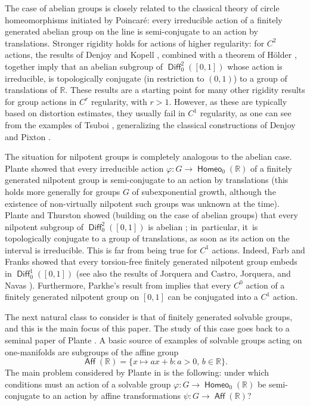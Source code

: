\documentclass[JEP,XML,SOM,Unicode,NoFloatCountersInSection,published]{cedram}
\theoremstyle{definition}
\DeclareMathOperator{\Aff}{\mathsf{Aff}}
\DeclareMathOperator{\Diff}{\mathsf{Diff}}
\DeclareMathOperator{\homeo}{\mathsf{Homeo}}
\newcommand{\R}{\mathbb{R}}
\begin{document}
The case of abelian groups is closely related to the classical theory of circle homeomorphisms initiated by Poincaré: every irreducible action of a finitely generated abelian group on the line is semi-conjugate to an action by translations. Stronger rigidity holds for actions of higher regularity: for $C^2$ actions, the results of Denjoy \cite{Denjoy} and Kopell \cite{Kopell}, combined with a theorem of Hölder \cite{Holder}, together imply that an abelian subgroup of $\Diff^2_0([0, 1])$ whose action is irreducible, is topologically conjugate (in restriction to $(0, 1)$) to a group of translations of $\R$. These results are a starting point for many other rigidity results for group actions in $C^r$ regularity, with $r>1$. However, as these are typically based on distortion estimates, they usually fail in $C^1$ regularity, as one can see from the examples of Tsuboi \cite{Tsuboi-Kopell}, generalizing the classical constructions of Denjoy \cite{Denjoy} and Pixton \cite{Pixton}.

The situation for nilpotent groups is completely analogous to the abelian case. Plante showed that every irreducible action $\varphi\colon G\to \homeo_0(\R)$ of a finitely generated nilpotent group is semi-conjugate to an action by translations \cite{PlanteMeasure} (this holds more generally for groups $G$ of subexponential growth, although the existence of non-virtually nilpotent such groups was unknown at the time). Plante and Thurston showed (building on the case of abelian groups) that every nilpotent subgroup of $\Diff_0^2([0, 1])$ is abelian \cite{Plante-Thurston}; in~particular, it~is topologically conjugate to a group of translations, as soon as its action on the interval is irreducible. This is far from being true for $C^1$ actions. Indeed, Farb and Franks \cite{Farb-Franks} showed that every torsion-free finitely generated nilpotent group embeds in $\Diff^1_0([0, 1])$ (see also the results of Jorquera \cite{Jorquera} and Castro, Jorquera, and Navas \cite{CJN}). Furthermore, Parkhe's result from \cite{Parkhe} implies that every $C^0$ action of a finitely generated nilpotent group on $[0,1]$ can be conjugated into a $C^1$ action.

The next natural class to consider is that of finitely generated solvable groups, and this is the main focus of this paper. The study of this case goes back to a seminal paper of Plante \cite{Plante}. A basic source of examples of solvable groups acting on one-manifolds are subgroups of the affine group
\[\Aff(\R)=\{x\mapsto ax+b: a>0,\, b\in \R\}.
\]
The main problem considered by Plante in \cite{Plante} is the following: under which conditions must an action of a solvable group $\varphi\colon G\to \homeo_0(\R)$ be semi-conjugate to an action by affine transformations $\psi\colon G\to\Aff(\R)$?
\end{document}
